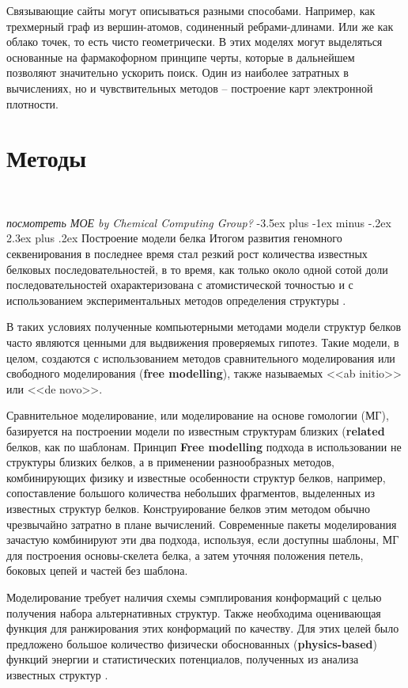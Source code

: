 \documentclass[a4paper,14pt]{extreport}
\makeatletter
\renewcommand{\section}{\@startsection{section}{1}{0pt}%
	{-3.5ex plus -1ex minus -.2ex}%
	{2.3ex plus .2ex}%
	{\centering\hyphenpenalty=10000\normalfont\Large\bfseries}}
\makeatother
\begin{document}
	Связывающие сайты могут описываться разными способами. Например, как трехмерный граф из вершин-атомов, содиненный ребрами-длинами. Или же как облако точек, то есть чисто геометрически. В этих моделях могут выделяться основанные на фармакофорном принципе черты, которые в дальнейшем позволяют значительно ускорить поиск. Один из наиболее затратных в вычислениях, но и чувствительных методов -- построение карт электронной плотности\cite{Ehrt2016}.
	\cite{Cabrera}
	\cite{Brylinski}
	\cite{Govindaraj2018}
	\chapter{Методы}\
	
	\textit{посмотреть МОЕ by Chemical Computing Group?}
	\section{Построение модели белка}
	Итогом развития геномного секвенирования в последнее время стал резкий рост количества известных белковых последовательностей, в то время, как только около одной сотой доли последовательностей охарактеризована с атомистической точностью и с использованием экспериментальных методов определения структуры \cite{Webb2017}.
	
	В таких условиях полученные компьютерными методами модели структур белков часто являются ценными для выдвижения проверяемых гипотез. Такие модели, в целом, создаются с использованием методов сравнительного моделирования или свободного моделирования (\textbf{free modelling}), также называемых <<ab initio>> или <<de novo>>\cite{Webb2017}.
	
	Сравнительное моделирование, или моделирование на основе гомологии (МГ), базируется на построении модели по известным структурам близких (\textbf{related} белков, как по шаблонам. Принцип \textbf{Free modelling} подхода в использовании не структуры близких белков, а в применении разнообразных методов, комбинирующих физику и известные особенности структур белков, например, сопоставление большого количества небольших фрагментов, выделенных из известных структур белков. Конструирование белков этим методом обычно чрезвычайно затратно в плане вычислений\cite{Webb2017}. Современные пакеты моделирования зачастую комбинируют эти два подхода, используя, если доступны шаблоны, МГ для построения основы-скелета белка, а затем уточняя положения петель, боковых цепей и частей без шаблона.
	
	Моделирование требует наличия схемы сэмплирования конформаций с целью получения набора альтернативных структур. Также необходима оценивающая функция для ранжирования этих конформаций по качеству. Для этих целей было предложено большое количество физически обоснованных (\textbf{physics-based}) функций энергии и статистических потенциалов, полученных из анализа известных структур \cite{BetterDOPE}.
	
\end{document}
